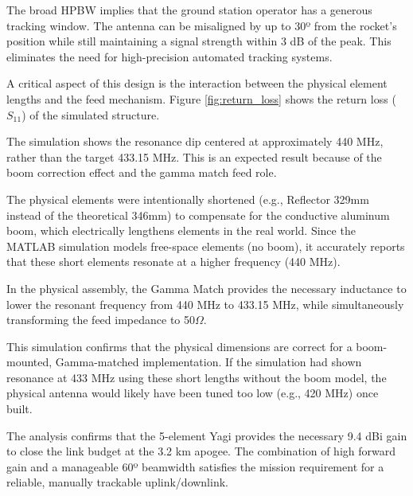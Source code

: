 The broad HPBW implies that the ground station operator has a generous tracking window. The antenna can be misaligned by up to 30º from the rocket's position while still maintaining a signal strength within 3 dB of the peak. This eliminates the need for high-precision automated tracking systems. 

A critical aspect of this design is the interaction between the physical element lengths and the feed mechanism. Figure \ref{fig:return_loss} shows the return loss ($S_{11}$) of the simulated structure.

The simulation shows the resonance dip centered at approximately 440 MHz, rather than the target 433.15 MHz. This is an expected result because of the boom correction effect and the gamma match feed role. 

The physical elements were intentionally shortened (e.g., Reflector 329mm instead of the theoretical 346mm) to compensate for the conductive aluminum boom, which electrically lengthens elements in the real world. Since the MATLAB simulation models free-space elements (no boom), it accurately reports that these short elements resonate at a higher frequency (440 MHz). 

In the physical assembly, the Gamma Match provides the necessary inductance to lower the resonant frequency from 440 MHz to 433.15 MHz, while simultaneously transforming the feed impedance to 50$\Omega$. 

This simulation confirms that the physical dimensions are correct for a boom-mounted, Gamma-matched implementation. If the simulation had shown resonance at 433 MHz using these short lengths without the boom model, the physical antenna would likely have been tuned too low (e.g., 420 MHz) once built. 

The analysis confirms that the 5-element Yagi provides the necessary 9.4 dBi gain to close the link budget at the 3.2 km apogee. The combination of high forward gain and a manageable 60º beamwidth satisfies the mission requirement for a reliable, manually trackable uplink/downlink. 